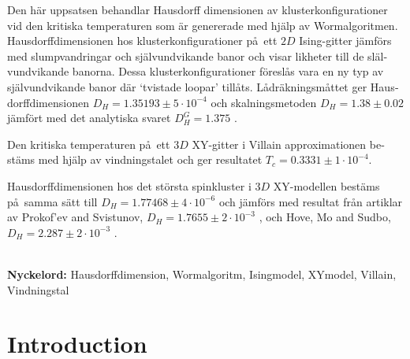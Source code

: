 \documentclass[nocoverpage,swedish,g5paper]{thesis}
\begin{document}
\begin{otherlanguage}{swedish}
\begin{foreginabstract}
Den h\"ar uppsatsen behandlar Hausdorff dimensionen av klusterkonfigurationer vid den kritiska temperaturen som \"ar genererade med hj\"alp av Wormalgoritmen. Hausdorffdimensionen hos klusterkonfigurationer p\aa \ ett $2D$ Ising-gitter j\"amf\"ors med slumpvandringar och sj\"alvundvikande banor och visar likheter till de sl\"alvundvikande banorna. Dessa klusterkonfigurationer f\"oresl\aa s vara en ny typ av sj\"alvundvikande banor d\"ar `tvistade loopar' till\aa ts. L\aa dr\"akningsm\aa ttet \cite{strogatz:dynamics_chaos} ger Hausdorffdimensionen $D_H = 1.35193 \pm 5 \cdot 10^{-4}$ och skalningsmetoden \cite{Hove:hausdorff_crit_fluctuations} $D_H = 1.38 \pm 0.02$ j\"amf\"ort med det analytiska svaret $D_H^{G} = 1.375$ \cite{Duplantier:GeoHausdorff}.

Den kritiska temperaturen p\aa \  ett $3D$ XY-gitter i Villain approximationen best\"ams med hj\"alp av vindningstalet och ger resultatet $T_c = 0.3331 \pm 1 \cdot 10^{-4}$.

Hausdorffdimensionen hos det st\"orsta spinkluster i $3D$ XY-modellen best\"ams p\aa\  samma s\"att till $D_H = 1.77468 \pm 4 \cdot 10^{-6}$ och j\"amf\"ors med resultat fr\aa n artiklar av Prokof'ev and Svistunov, $D_H = 1.7655 \pm 2 \cdot 10^{-3}$ \cite{Prokofev:comment_on_hove_hausdorff_crit_fluct}, och Hove, Mo and Sudbo, $D_H = 2.287 \pm 2 \cdot 10^{-3}$ \cite{Hove:hausdorff_crit_fluctuations}.
\\ \noindent \strut \\
\textbf{Nyckelord:} Hausdorffdimension, Wormalgoritm, Isingmodel, XYmodel, Villain, Vindningstal
\end{foreginabstract}
\end{otherlanguage}

\begin{preface}

\end{preface}

\tableofcontents

\mainmatter


\chapter{Introduction}

\end{document}
